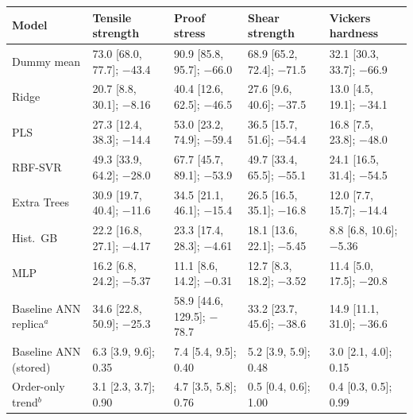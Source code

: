 \begin{tabular}{@{}lllll@{}}
\toprule
Model & Tensile strength & Proof stress & Shear strength & Vickers hardness \\
\midrule
Dummy mean & 73.0 [68.0, 77.7]; $-$43.4 & 90.9 [85.8, 95.7]; $-$66.0 & 68.9 [65.2, 72.4]; $-$71.5 & 32.1 [30.3, 33.7]; $-$66.9 \\
Ridge & 20.7 [8.8, 30.1]; $-$8.16 & 40.4 [12.6, 62.5]; $-$46.5 & 27.6 [9.6, 40.6]; $-$37.5 & 13.0 [4.5, 19.1]; $-$34.1 \\
PLS & 27.3 [12.4, 38.3]; $-$14.4 & 53.0 [23.2, 74.9]; $-$59.4 & 36.5 [15.7, 51.6]; $-$54.4 & 16.8 [7.5, 23.8]; $-$48.0 \\
RBF-SVR & 49.3 [33.9, 64.2]; $-$28.0 & 67.7 [45.7, 89.1]; $-$53.9 & 49.7 [33.4, 65.5]; $-$55.1 & 24.1 [16.5, 31.4]; $-$54.5 \\
Extra Trees & 30.9 [19.7, 40.4]; $-$11.6 & 34.5 [21.1, 46.1]; $-$15.4 & 26.5 [16.5, 35.1]; $-$16.8 & 12.0 [7.7, 15.7]; $-$14.4 \\
Hist.\ GB & 22.2 [16.8, 27.1]; $-$4.17 & 23.3 [17.4, 28.3]; $-$4.61 & 18.1 [13.6, 22.1]; $-$5.45 & 8.8 [6.8, 10.6]; $-$5.36 \\
MLP & 16.2 [6.8, 24.2]; $-$5.37 & 11.1 [8.6, 14.2]; $-$0.31 & 12.7 [8.3, 18.2]; $-$3.52 & 11.4 [5.0, 17.5]; $-$20.8 \\
Baseline ANN replica$^{a}$ & 34.6 [22.8, 50.9]; $-$25.3 & 58.9 [44.6, 129.5]; $-$78.7 & 33.2 [23.7, 45.6]; $-$38.6 & 14.9 [11.1, 31.0]; $-$36.6 \\
Baseline ANN (stored) & 6.3 [3.9, 9.6]; 0.35 & 7.4 [5.4, 9.5]; 0.40 & 5.2 [3.9, 5.9]; 0.48 & 3.0 [2.1, 4.0]; 0.15 \\
Order-only trend$^{b}$ & 3.1 [2.3, 3.7]; 0.90 & 4.7 [3.5, 5.8]; 0.76 & 0.5 [0.4, 0.6]; 1.00 & 0.4 [0.3, 0.5]; 0.99 \\
\bottomrule
\end{tabular}
